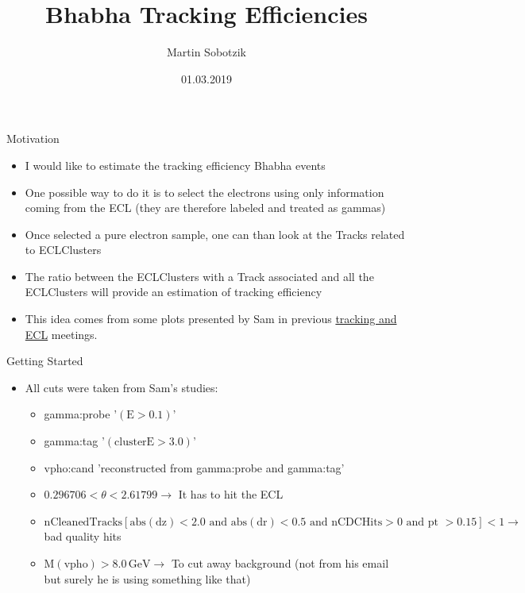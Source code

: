 \documentclass[10pt]{beamer}
\title{Bhabha Tracking Efficiencies}
\date{01.03.2019}
\author{Martin Sobotzik}
\institute{Johannes Gutenberg Universit\"at Mainz}
\begin{document}
\maketitle
{%



\begin{frame}{Motivation}

\begin{itemize}	
	\item I would like to estimate the tracking efficiency Bhabha events
	\item One possible way to do it is to select the electrons using only information coming from the ECL (they are therefore labeled and treated as gammas)
	
	\item Once selected a pure electron sample, one can than look at the Tracks related to ECLClusters
	\item The ratio between the ECLClusters with a Track associated and all the ECLClusters will provide an estimation of tracking efficiency
	\item This idea comes from some plots presented by Sam in previous  \href{https://confluence.desy.de/display/BI/ECL+Meetings?preview=/84320165/109161400/SCunliffe181123-ECL.pdf}{tracking and ECL} meetings. 

\end{itemize}
\end{frame}
	
\begin{frame}{Getting Started}
	
\begin{itemize} 
	\item All cuts were taken from Sam's studies:
	
	
	\begin{itemize}
		\item gamma:probe '$(\textrm{E} > 0.1 )$'
		\item gamma:tag '$(\textrm{clusterE} > 3.0)$'
		\item vpho:cand 'reconstructed from gamma:probe and gamma:tag'
	\end{itemize}

	
		\begin{itemize}
			\item $0.296706 < \theta < 2.61799 \rightarrow$ It has to hit the ECL
			\item $\textrm{nCleanedTracks}[ \textrm{abs}(\textrm{dz}) < 2.0 \textrm{ and } \textrm{abs}(\textrm{dr}) < 0.5 \textrm{ and nCDCHits} > 0 \textrm{ and pt } > 0.15] < 1 \rightarrow $ bad quality hits 
			\item $\textrm{M}(\textrm{vpho}) > 8.0\,\textrm{GeV} \rightarrow $ To cut away background (not from his email but surely he is using something like that)					
		\end{itemize}
	

\end{itemize}
\end{frame}}
\end{document}
